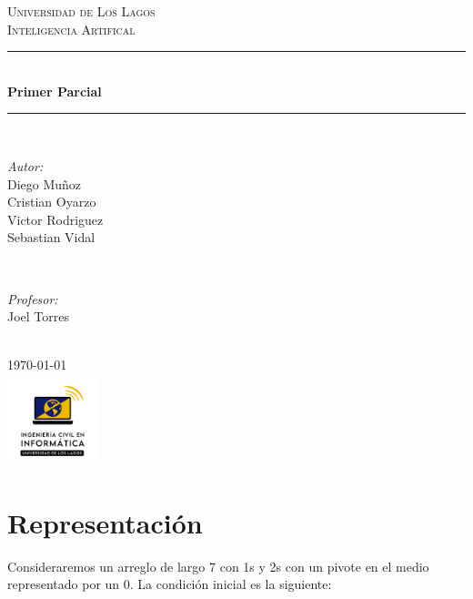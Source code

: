 \documentclass[letterpaper]{article}
\begin{document}
\begin{titlepage}
    \newcommand{\HRule}{\rule{\linewidth}{0.5mm}}
    \center
    \textsc{\LARGE Universidad de Los Lagos}\\[1.5cm]
    \textsc{\Large Inteligencia Artifical}\\[0.5cm]
    \HRule \\[0.4cm]
    { \huge \bfseries Primer Parcial}\\[0.4cm]
    \HRule \\[1.5cm]
    \begin{minipage}{0.4\textwidth}
        \begin{flushleft} \large
            \emph{Autor:}\\
            Diego Muñoz\\
            Cristian Oyarzo\\
            Victor Rodriguez\\
            Sebastian Vidal\\
        \end{flushleft}
    \end{minipage}
    ~
    \begin{minipage}{0.4\textwidth}
        \begin{flushright} \large
            \emph{Profesor:}\\
            Joel Torres\\
        \end{flushright}
    \end{minipage}\\[2cm]
    {\large \today}\\[2cm]
    \includegraphics[width=100px, keepaspectratio]{icinf}\\[1cm]
    \vfill
\end{titlepage}
\tableofcontents
\newpage

\section{Representación}

Consideraremos un arreglo de largo 7 con 1s y 2s con un pivote en el medio representado
por un 0. La condición inicial es la siguiente:
\end{document}
